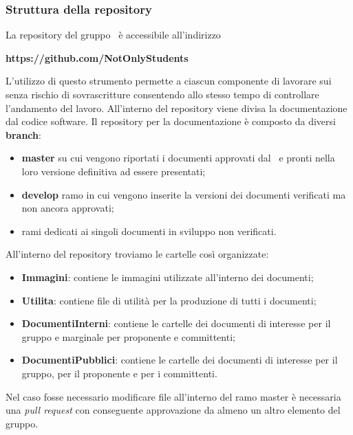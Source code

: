 \subsubsection{Struttura della repository}\label{StrutturaRepo}
La repository del gruppo \Gruppo\ è accessibile all'indirizzo
\begin{center}
	\textbf{https://github.com/NotOnlyStudents}
\end{center}
L'utilizzo di questo strumento permette a ciascun componente di lavorare sui  senza rischio di sovrascritture consentendo allo stesso tempo di controllare l'andamento del lavoro. 
All'interno del repository viene divisa la documentazione dal codice software.
\label{RepoDoc}
Il repository per la documentazione è composto da diversi \textbf{branch}:
\begin{itemize}
	\item \textbf{master} su cui vengono riportati i documenti approvati dal \Responsabile\ e pronti nella loro versione definitiva ad essere presentati;
	\item \textbf{develop} ramo in cui vengono inserite la versioni dei documenti verificati ma non ancora approvati;
	\item rami dedicati ai singoli documenti in sviluppo non verificati.
\end{itemize}
All'interno del repository troviamo le cartelle così organizzate:
\begin{itemize}
	\item \textbf{Immagini}: contiene le immagini utilizzate all'interno dei documenti;
	\item \textbf{Utilita}: contiene file di utilità per la produzione di tutti i documenti;
	\item \textbf{DocumentiInterni}: contiene le cartelle dei documenti di interesse per il gruppo e marginale per proponente e committenti;
	\item \textbf{DocumentiPubblici}: contiene le cartelle dei documenti di interesse per il gruppo, per il proponente e per i committenti.
\end{itemize}
\label{ModificaRepo}
Nel caso fosse necessario modificare file all'interno del ramo master è necessaria una \textit{pull request} con conseguente approvazione da almeno un altro elemento del gruppo.